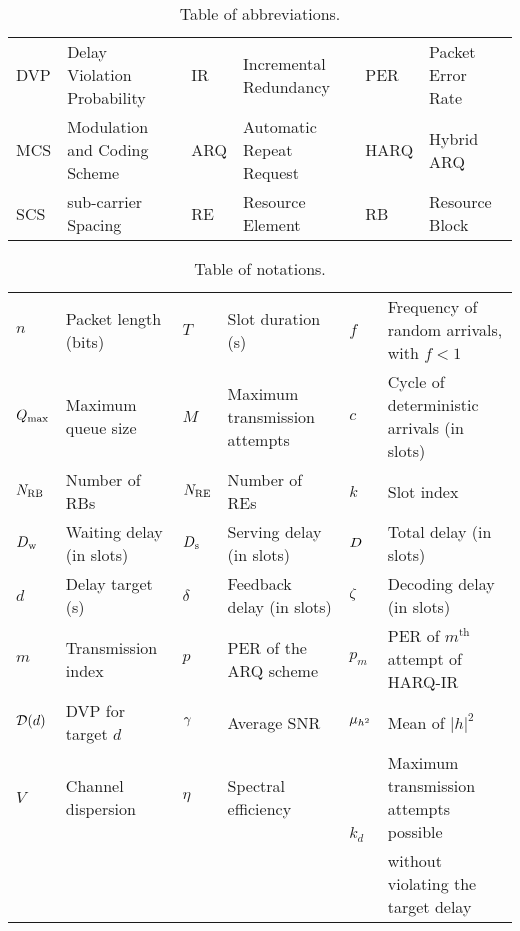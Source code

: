 \begin{table*}[t]
\centering
\renewcommand{\arraystretch}{1.25}
\caption{Table of abbreviations.}
\label{Tab:abbr}
\begin{tabular}{|ll|ll|ll|}
\hline
DVP & Delay Violation Probability    & IR  & Incremental Redundancy   & PER  & Packet Error Rate \\
MCS & Modulation and Coding Scheme & ARQ & Automatic Repeat Request & HARQ & Hybrid ARQ        \\
SCS & sub-carrier Spacing   & RE  & Resource Element         & RB   & Resource Block    \\ \hline
\end{tabular}
\end{table*}
\begin{table*}[t]
\centering
\renewcommand{\arraystretch}{1.25}
\caption{Table of notations.}
\label{Tab:notations}
\begin{tabular}{|ll|ll|ll|}
\hline
$n$       & Packet length (bits)     & $T$      & Slot duration (s)             & $f$                    & Frequency of random arrivals, with $f<1$   \\
$Q_{\mathrm{max}}$   & Maximum queue size       & $M$      & Maximum transmission attempts & $c$                    & Cycle of deterministic arrivals (in slots) \\
$N_{\mathrm{RB}}$    & Number of RBs            & $N_{\mathrm{RE}}$   & Number of REs                 & $k$                    & Slot index                                 \\
$D_{\mathrm{w}}$  & Waiting delay (in slots) & $D_{\mathrm{s}}$ & Serving delay (in slots)      & $D$                & Total delay (in slots)                     \\
$d$       & Delay target (s)         & $\delta$ & Feedback delay (in slots)     & ${\zeta}$              & Decoding delay (in slots)                  \\
$m$       & Transmission index       & $p$      & PER of the ARQ scheme         & $p_m$                  & PER of $m^{\text{th}}$ attempt of HARQ-IR  \\
$\mathcal{D}(d)$ & DVP for target $d$       & $\gamma$   & Average SNR                   & ${\mu_{h^2}}$                & Mean of $\vert h\vert^2$                   \\
$V$       & Channel dispersion       & $\eta$   & Spectral efficiency           & \multirow{2}{*}{$k_d$} & Maximum transmission attempts possible     \\
          &                          &          &                               &                        & without violating the target delay         \\ \hline
\end{tabular}
\end{table*}

